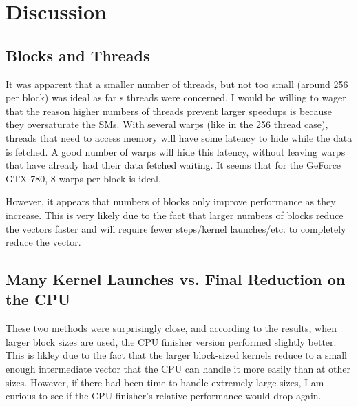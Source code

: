 \documentclass{article}
\begin{document}
\newpage
\section{Discussion}
\subsection{Blocks and Threads}
It was apparent that a smaller number of threads, but not too small (around 256 per block) was ideal as far s threads were concerned. I would be willing to wager that the reason higher numbers of threads prevent larger speedups is because they oversaturate the SMs. With several warps (like in the 256 thread case), threads that need to access memory will have some latency to hide while the data is fetched. A good number of warps will hide this latency, without leaving warps that have already had their data fetched waiting. It seems that for the GeForce GTX 780, 8 warps per block is ideal.

However, it appears that numbers of blocks only improve performance as they increase. This is very likely due to the fact that larger numbers of blocks reduce the vectors faster and will require fewer steps/kernel launches/etc. to completely reduce the vector.

\subsection{Many Kernel Launches vs. Final Reduction on the CPU}
These two methods were surprisingly close, and according to the results, when larger block sizes are used, the CPU finisher version performed slightly better. This is likley due to the fact that the larger block-sized kernels reduce to a small enough intermediate vector that the CPU can handle it more easily than at other sizes. However, if there had been time to handle extremely large sizes, I am curious to see if the CPU finisher's relative performance would drop again.
\end{document}
